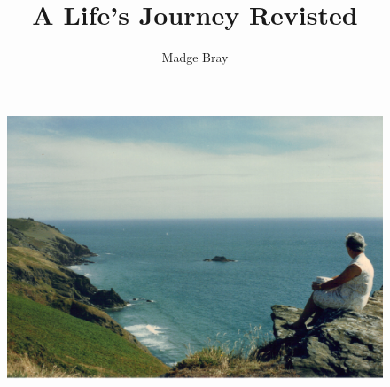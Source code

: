 \documentclass[12pt, letterpaper, twoside]{book}
\begin{document}
\frontmatter %
    \title{A Life's Journey Revisted}
    \author{Madge Bray}
    \maketitle

    \begin{figure}
      \includegraphics[width=\textwidth]{photos/madge-by-sea.jpg}
      \label{madge-by-sea}
    \end{figure}

    \tableofcontents

    
    


\mainmatter  %
    


\appendix
    
    

\backmatter
\end{document}
